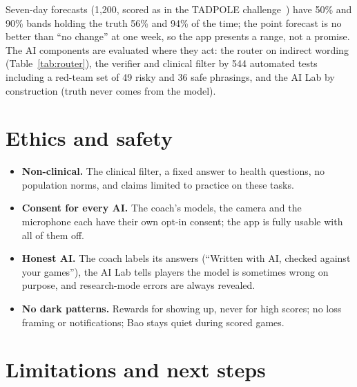 \documentclass[11pt,a4paper]{article}
\begin{document}
Seven-day forecasts (1{,}200, scored as in the TADPOLE challenge~\cite{tadpole}) have 50\% and 90\% bands holding the truth 56\% and 94\% of the time; the point forecast is no better than ``no change'' at one week, so the app presents a range, not a promise. The AI components are evaluated where they act: the router on indirect wording (Table~\ref{tab:router}), the verifier and clinical filter by 544 automated tests including a red-team set of 49 risky and 36 safe phrasings, and the AI Lab by construction (truth never comes from the model).

\section{Ethics and safety}

\begin{itemize}
\item \textbf{Non-clinical.} The clinical filter, a fixed answer to health questions, no population norms, and claims limited to practice on these tasks.
\item \textbf{Consent for every AI.} The coach's models, the camera and the microphone each have their own opt-in consent; the app is fully usable with all of them off.
\item \textbf{Honest AI.} The coach labels its answers (``Written with AI, checked against your games''), the AI Lab tells players the model is sometimes wrong on purpose, and research-mode errors are always revealed.
\item \textbf{No dark patterns.} Rewards for showing up, never for high scores; no loss framing or notifications; Bao stays quiet during scored games.
\end{itemize}

\section{Limitations and next steps}
\label{sec:limits}
\end{document}
